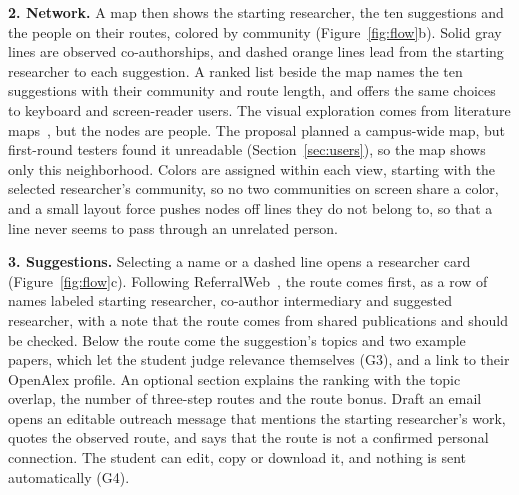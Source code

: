 \documentclass[sigconf,nonacm]{acmart}
\begin{document}
\textbf{2. Network.} A map then shows the starting researcher, the ten suggestions and the people on their routes, colored by community (Figure~\ref{fig:flow}b). Solid gray lines are observed co-authorships, and dashed orange lines lead from the starting researcher to each suggestion. A ranked list beside the map names the ten suggestions with their community and route length, and offers the same choices to keyboard and screen-reader users. The visual exploration comes from literature maps~\cite{connectedpapers,researchrabbit}, but the nodes are people. The proposal planned a campus-wide map, but first-round testers found it unreadable (Section~\ref{sec:users}), so the map shows only this neighborhood. Colors are assigned within each view, starting with the selected researcher's community, so no two communities on screen share a color, and a small layout force pushes nodes off lines they do not belong to, so that a line never seems to pass through an unrelated person.

\textbf{3. Suggestions.} Selecting a name or a dashed line opens a researcher card (Figure~\ref{fig:flow}c). Following ReferralWeb~\cite{kautz1997}, the route comes first, as a row of names labeled starting researcher, co-author intermediary and suggested researcher, with a note that the route comes from shared publications and should be checked. Below the route come the suggestion's topics and two example papers, which let the student judge relevance themselves (G3), and a link to their OpenAlex profile. An optional section explains the ranking with the topic overlap, the number of three-step routes and the route bonus. Draft an email opens an editable outreach message that mentions the starting researcher's work, quotes the observed route, and says that the route is not a confirmed personal connection. The student can edit, copy or download it, and nothing is sent automatically (G4).
\end{document}
